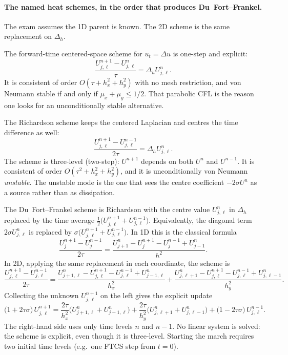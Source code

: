 \paragraph{The named heat schemes, in the order that produces Du~Fort--Frankel.}

The exam assumes the 1D parent is known. The 2D scheme is the same replacement on \(\Delta_h\).

\begin{definition}[FTCS]
\label{def:ftcs}
The forward-time centered-space scheme for \(u_t=\Delta u\) is one-step and explicit:
\[
\frac{U_{j,\ell}^{n+1}-U_{j,\ell}^n}{\tau}
=
\Delta_h U_{j,\ell}^n.
\]
It is consistent of order \(O(\tau+h_x^2+h_y^2)\) with no mesh restriction, and von Neumann stable if and only if \(\mu_x+\mu_y\le 1/2\). That parabolic CFL is the reason one looks for an unconditionally stable alternative.
\end{definition}

\begin{definition}
\label{def:richardson}
The Richardson scheme keeps the centered Laplacian and centres the time difference as well:
\[
\frac{U_{j,\ell}^{n+1}-U_{j,\ell}^{n-1}}{2\tau}
=
\Delta_h U_{j,\ell}^n.
\]
The scheme is three-level (two-step): \(U^{n+1}\) depends on both \(U^n\) and \(U^{n-1}\). It is consistent of order \(O(\tau^2+h_x^2+h_y^2)\), and it is unconditionally von Neumann \emph{unstable}. The unstable mode is the one that sees the centre coefficient \(-2\sigma U^n\) as a source rather than as dissipation.
\end{definition}

\begin{definition}
\label{def:dff}
The Du~Fort--Frankel scheme is Richardson with the centre value \(U_{j,\ell}^n\) in \(\Delta_h\) replaced by the time average \(\frac12\bigl(U_{j,\ell}^{n+1}+U_{j,\ell}^{n-1}\bigr)\). Equivalently, the diagonal term \(2\sigma U_{j,\ell}^n\) is replaced by \(\sigma\bigl(U_{j,\ell}^{n+1}+U_{j,\ell}^{n-1}\bigr)\). In 1D this is the classical formula
\[
\frac{U_j^{n+1}-U_j^{n-1}}{2\tau}
=
\frac{U_{j+1}^n-U_j^{n+1}-U_j^{n-1}+U_{j-1}^n}{h^2}.
\]
In 2D, applying the same replacement in each coordinate, the scheme is
\[
\frac{U_{j,\ell}^{n+1}-U_{j,\ell}^{n-1}}{2\tau}
=
\frac{U_{j+1,\ell}^n-U_{j,\ell}^{n+1}-U_{j,\ell}^{n-1}+U_{j-1,\ell}^n}{h_x^2}
+
\frac{U_{j,\ell+1}^n-U_{j,\ell}^{n+1}-U_{j,\ell}^{n-1}+U_{j,\ell-1}^n}{h_y^2}.
\]
Collecting the unknown \(U_{j,\ell}^{n+1}\) on the left gives the explicit update
\[
\bigl(1+2\tau\sigma\bigr)\,U_{j,\ell}^{n+1}
=
\frac{2\tau}{h_x^2}\bigl(U_{j+1,\ell}^n+U_{j-1,\ell}^n\bigr)
+
\frac{2\tau}{h_y^2}\bigl(U_{j,\ell+1}^n+U_{j,\ell-1}^n\bigr)
+
\bigl(1-2\tau\sigma\bigr)\,U_{j,\ell}^{n-1}.
\]
The right-hand side uses only time levels \(n\) and \(n-1\). No linear system is solved: the scheme is explicit, even though it is three-level. Starting the march requires two initial time levels (e.g.\ one FTCS step from \(t=0\)).
\end{definition}

